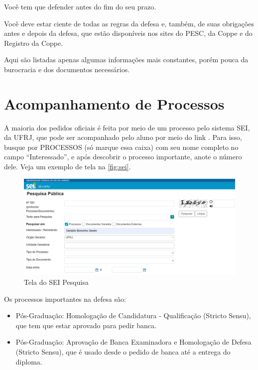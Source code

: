 Você tem que defender antes do fim do seu prazo. 

Você deve estar ciente de todas as regras da defesa e, também, de suas obrigações antes e depois da defesa, que estão disponíveis nos sites do PESC, da Coppe e do Registro da Coppe.

Aqui são listadas apenas algumas informações mais constantes, porém pouca da burocracia e dos documentos necessários.

\section{Acompanhamento de Processos}
A maioria dos pedidos oficiais é feita por meio de um processo pelo sistema SEI, da UFRJ, que pode ser acompanhado pelo aluno por meio do link . Para isso, busque por PROCESSOS (só marque essa caixa) com seu nome completo no campo ``Interessado'', e após descobrir o processo importante, anote o número dele. Veja um exemplo de tela na \autoref{fig:sei}.

\begin{figure}[hbt]
    \centering
    \includegraphics[width=\linewidth]{Images/SEIPesquisa.png}
    \caption{Tela do SEI Pesquisa}
    \label{fig:sei}
\end{figure}

Os processos importantes na defesa são:
\begin{itemize}
    \item Pós-Graduação: Homologação de Candidatura - Qualificação (Stricto Sensu), que tem que estar aprovado para pedir banca.
    \item Pós-Graduação: Aprovação de Banca Examinadora e Homologação de Defesa (Stricto Sensu), que é usado desde o pedido de banca até a entrega do diploma.

\end{itemize}

